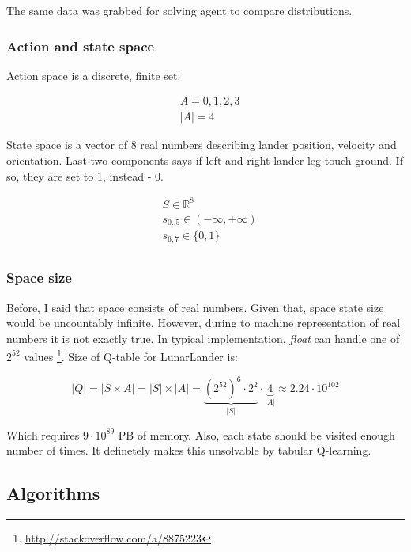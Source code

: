 \documentclass[12pt]{article}
\begin{document}
The same data was grabbed for solving agent to compare distributions.

\subsubsection{Action and state space}

Action space is a discrete, finite set:

\begin{equation}
\begin{aligned}
&A = {0,1,2,3} \\
&|A| = 4
\end{aligned}
\end{equation}

State space is a vector of 8 real numbers describing lander position, velocity and orientation. Last two components says if left and right lander leg touch ground. If so, they are set to 1, instead - 0.

\begin{equation}
\begin{aligned}
&S \in \mathbb{R}^8 \\
&s_{0..5} \in (-\infty, +\infty) \\
&s_{6,7} \in \{0,1\} \\
\end{aligned}
\end{equation}

\subsubsection{Space size}

Before, I said that space consists of real numbers. Given that, space state size  would be uncountably infinite. However, during to machine representation of real numbers it is not exactly true. In typical implementation, \emph{float} can handle one of $2^{52}$ values \footnote{\url{http://stackoverflow.com/a/8875223}}. Size of Q-table for LunarLander is:

\begin{equation}
|Q| = |S \times A| = |S| \times |A| = \underbrace{{(2^{52})}^6 \cdot 2^2}_{|S|} \cdot \underbrace{4}_{|A|} \approx 2.24 \cdot 10^{102}
\end{equation}

Which requires $9 \cdot 10^{89}$ PB of memory. Also, each state should be visited enough number of times. It definetely makes this unsolvable by tabular Q-learning.

\subsection{Algorithms}
\end{document}
